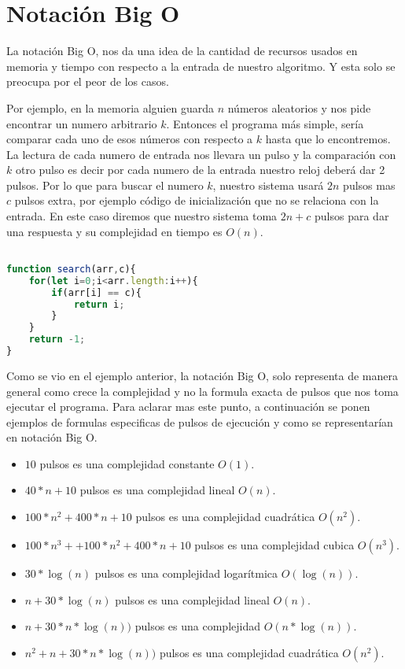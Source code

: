 \section{Notación Big O}
 
 La notación Big O, nos da una idea de la cantidad de recursos usados en memoria y tiempo con respecto a la entrada de nuestro algoritmo. Y esta solo se preocupa por el peor de los casos.
 
 
 Por ejemplo, en la memoria alguien guarda $n$ números aleatorios y nos pide encontrar un numero arbitrario $k$. Entonces el programa más simple, sería comparar cada uno de esos números con respecto a $k$ hasta que lo encontremos. La lectura de cada numero de entrada nos llevara un pulso y la comparación con $k$ otro pulso es decir por cada numero de la entrada nuestro reloj deberá dar 2 pulsos. Por lo que para buscar el numero $k$, nuestro sistema usará $2n$ pulsos mas $c$ pulsos extra, por ejemplo código de inicialización que no se relaciona con la entrada. En este caso diremos que nuestro sistema toma $2n+c$ pulsos para dar una respuesta y su complejidad en tiempo es $O(n)$. 
 
 \begin{lstlisting}[language=JavaScript, caption=Busca un elemento c]

function search(arr,c){
    for(let i=0;i<arr.length:i++){
        if(arr[i] == c){
            return i;
        }
    }
    return -1;
}
\end{lstlisting}
 
Como se vio en el ejemplo anterior, la notación Big O, solo representa de manera general como crece la complejidad y no la formula exacta de pulsos que nos toma ejecutar el programa. Para aclarar mas este punto, a continuación se ponen ejemplos de formulas especificas de pulsos de ejecución y como se representarían en notación Big O.

\begin{itemize}
    \item $10$ pulsos es  una complejidad constante $O(1)$.
    \item $40*n+10$ pulsos es  una complejidad lineal $O(n)$.
    \item $100*n^2 + 400*n+10$ pulsos es  una complejidad cuadrática $O(n^2)$.
    \item $100*n^3 + + 100*n^2 + 400*n+10$ pulsos es  una complejidad cubica $O(n^3)$.
    \item $30*\log(n)$ pulsos es  una complejidad logarítmica $O(\log(n))$. 
    \item $n + 30*\log(n)$ pulsos es  una complejidad lineal $O(n)$.
    \item $n + 30*n*\log(n))$ pulsos es  una complejidad $O(n*\log(n))$.
    \item $n^2 + n + 30*n*\log(n))$ pulsos es  una complejidad cuadrática $O(n^2)$.
\end{itemize}

